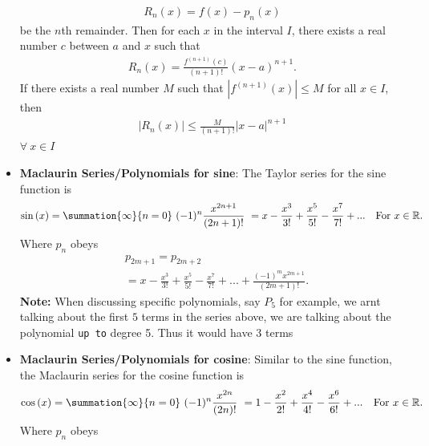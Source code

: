 \documentclass{report}
\begin{document}
\begin{itemize}
                \begin{align*}
                    R_n(x) = f(x) - p_n(x)
                \end{align*}
                be the $n$th remainder. Then for each $x$ in the interval $I$, there exists a real number $c$ between $a$ and $x$ such that
                \begin{align*}
                    R_n(x) = \frac{f^{(n+1)}(c)}{(n+1)!}(x - a)^{n+1}.
                \end{align*}
                If there exists a real number $M$ such that $\left|f^{(n+1)}(x)\right| \leq M$ for all $x \in I$, then
                \begin{align*}
                    \left|R_n(x)\right| \leq \frac{M}{(n+1)!}\left|x - a\right|^{n+1}
                \end{align*}
                $\forall\ x \in I$ 
            \item \textbf{Maclaurin Series/Polynomials for sine}:
                The Taylor series for the sine function is 
                \begin{align*}
                    \sin{(x)} = \summation{\infty}{n=0}\ (-1)^{n}\frac{x^{2n+1}}{(2n+1)!}\ = x-\frac{x^{3}}{3!} + \frac{x^{5}}{5!} - \frac{x^{7}}{7!}  + ... \quad \text{For } x\in\mathbb{R} 
                .\end{align*}
                Where $p_{n}$ obeys
                \begin{align*}
                   &p_{2m+1} = p_{2m+2} \\
                   &=x-\frac{x^{3}}{3!}+\frac{x^{5}}{5!}-\frac{x^{7}}{7!} + ... + \frac{(-1)^{m}x^{2m+1}}{(2m+1)!}
               .\end{align*}
               \textbf{Note:} When discussing specific polynomials, say $P_5 $ for example, we arnt talking about the first $5$ terms in the series above, we are talking about the polynomial \texttt{up to} degree 5. Thus it would have 3 terms
           \item \textbf{Maclaurin Series/Polynomials for cosine}: Similar to the sine function, the Maclaurin series for the cosine function is 
               \begin{align*}
                   \cos{(x)} = \summation{\infty}{n=0}\ (-1)^{n}\frac{x^{2n}}{(2n)!}\ = 1 - \frac{x^{2}}{2!} + \frac{x^{4}}{4!} -\frac{x^{6}}{6!} + ... \quad \text{For } x\in\mathbb{R} 
               .\end{align*}
               Where $p_{n} $ obeys
               \begin{align*}

\end{align*}
\end{itemize}
\end{document}
